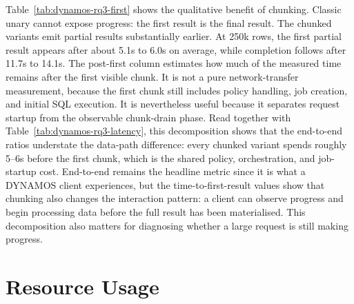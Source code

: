 Table~\ref{tab:dynamos-rq3-first} shows the qualitative benefit of chunking. Classic unary cannot expose progress: the first result is the final result. The chunked variants emit partial results substantially earlier. At 250k rows, the first partial result appears after about 5.1s to 6.0s on average, while completion follows after 11.7s to 14.1s. The post-first column estimates how much of the measured time remains after the first visible chunk. It is not a pure network-transfer measurement, because the first chunk still includes policy handling, job creation, and initial SQL execution. It is nevertheless useful because it separates request startup from the observable chunk-drain phase. Read together with Table~\ref{tab:dynamos-rq3-latency}, this decomposition shows that the end-to-end ratios understate the data-path difference: every chunked variant spends roughly 5--6s before the first chunk, which is the shared policy, orchestration, and job-startup cost. End-to-end remains the headline metric since it is what a DYNAMOS client experiences, but the time-to-first-result values show that chunking also changes the interaction pattern: a client can observe progress and begin processing data before the full result has been materialised. This decomposition also matters for diagnosing whether a large request is still making progress.

\section{Resource Usage}

